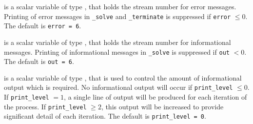 \begin{description}

 is a scalar variable of type \integer, that holds the
stream number for error messages. Printing of error messages in 
{\tt \packagename\_solve} and {\tt \packagename\_terminate} 
is suppressed if {\tt error} $\leq 0$.
The default is {\tt error = 6}.

 is a scalar variable of type \integer, that holds the
stream number for informational messages. Printing of informational messages in 
{\tt \packagename\_solve} is suppressed if {\tt out} $< 0$.
The default is {\tt out = 6}.

 is a scalar variable of type \integer, that is used
to control the amount of informational output which is required. No 
informational output will occur if {\tt print\_level} $\leq 0$. If 
{\tt print\_level} $= 1$, a single line of output will be produced for each
iteration of the process. If {\tt print\_level} $\geq 2$, this output will be
increased to provide significant detail of each iteration.
The default is {\tt print\_level = 0}.



\end{description}
